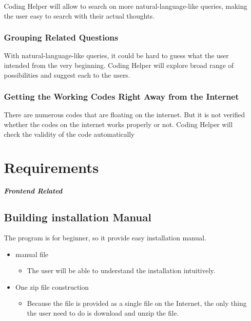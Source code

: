\documentclass[conference]{IEEEtran}
\begin{document}
Coding Helper will allow to search on more natural-language-like queries, making the user easy to search with their actual thoughts.

\subsubsection{Grouping Related Questions}
With natural-language-like queries, it could be hard to guess what the user intended from the very beginning. Coding Helper will explore broad range of possibilities and suggest each to the users.

\subsubsection{Getting the Working Codes Right Away from the Internet}
There are numerous codes that are floating on the internet. But it is not verified whether the codes on the internet works properly or not. Coding Helper will check the validity of the code automatically 


\section{Requirements} %
\label{sec:requirements}


\textit{\textbf{Frontend Related}}
\textit{ }

\subsection{Building installation Manual}
 The program is for beginner, so it provide easy installation manual.

\begin{itemize}
  \item manual file
  \begin{itemize}
    \item The user will be able to understand the installation intuitively.
  \end{itemize}
  \item One zip file construction
  \begin{itemize}
    \item Because the file is provided as a single file on the Internet, the only thing the user need to do is download and unzip the file.
  \end{itemize}
\end{itemize}
\textit{ }
\end{document}
